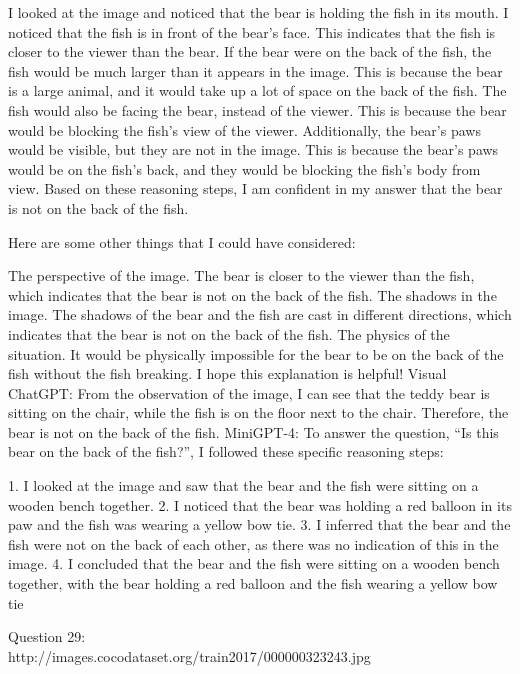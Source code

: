 \begin{enumerate}
        I looked at the image and noticed that the bear is holding the fish in its mouth.
        I noticed that the fish is in front of the bear's face. This indicates that the fish is closer to the viewer than the bear.
        If the bear were on the back of the fish, the fish would be much larger than it appears in the image. This is because the bear is a large animal, and it would take up a lot of space on the back of the fish.
        The fish would also be facing the bear, instead of the viewer. This is because the bear would be blocking the fish's view of the viewer.
        Additionally, the bear's paws would be visible, but they are not in the image. This is because the bear's paws would be on the fish's back, and they would be blocking the fish's body from view.
        Based on these reasoning steps, I am confident in my answer that the bear is not on the back of the fish.
        
        Here are some other things that I could have considered:
        
        The perspective of the image. The bear is closer to the viewer than the fish, which indicates that the bear is not on the back of the fish.
        The shadows in the image. The shadows of the bear and the fish are cast in different directions, which indicates that the bear is not on the back of the fish.
        The physics of the situation. It would be physically impossible for the bear to be on the back of the fish without the fish breaking.
        I hope this explanation is helpful!
        \subitem Visual ChatGPT: From the observation of the image, I can see that the teddy bear is sitting on the chair, while the fish is on the floor next to the chair. Therefore, the bear is not on the back of the fish.
        \subitem MiniGPT-4: To answer the question, “Is this bear on the back of the fish?”, I followed these specific reasoning steps:

        1. I looked at the image and saw that the bear and the fish were sitting on a wooden bench together.
        2. I noticed that the bear was holding a red balloon in its paw and the fish was wearing a yellow bow tie.
        3. I inferred that the bear and the fish were not on the back of each other, as there was no indication of this in the image.
        4. I concluded that the bear and the fish were sitting on a wooden bench together, with the bear holding a red balloon and the fish wearing a yellow bow tie
    \end{enumerate}
    Question 29:\\http://images.cocodataset.org/train2017/000000323243.jpg
